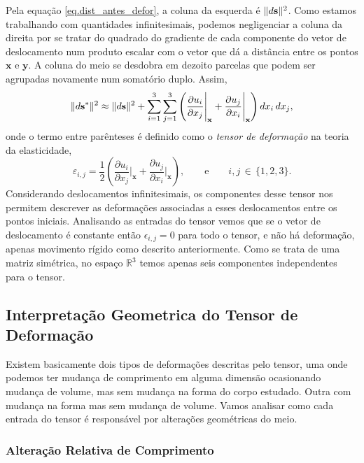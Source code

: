Pela equa\c{c}\~ao \ref{eq.dist_antes_defor}, a coluna  da esquerda \'e $\lVert d\mathbf{s}\rVert^2$. Como estamos trabalhando com quantidades infinitesimais, podemos negligenciar a coluna da direita por se tratar do quadrado do gradiente de cada componente do vetor de deslocamento num produto escalar com o vetor que d\'a a dist\^ancia entre os pontos $\mathbf{x}$  e $\mathbf{y}$. A coluna do meio se desdobra em dezoito parcelas que podem ser agrupadas novamente num somat\'orio duplo. Assim,
\begin{equation*}
\lVert d\mathbf{s}^*\rVert^2\approx\lVert d\mathbf{s}\rVert^2+\sum_{i=1}^3\sum_{j=1}^3\left(\frac{\partial u_i}{\partial x_j}\Bigg\vert_{\mathbf{x}}+\frac{\partial u_j}{\partial x_i}\Bigg\vert_{\mathbf{x}}\right)dx_i\,dx_j,
\end{equation*}
onde o termo entre par\^enteses \'e definido como o \textit{tensor de deforma\c{c}\~ao} na teoria da elasticidade,
\begin{equation*}
\varepsilon_{i,j}=\frac{1}{2}\left(\frac{\partial u_i}{\partial x_j}\Bigg\vert_{\mathbf{x}}+\frac{\partial u_j}{\partial x_i}\Bigg\vert_{\mathbf{x}}\right),\qquad\text{e}\qquad i,j\,\in\,\{1,2,3\}.
\end{equation*}
Considerando deslocamentos infinitesimais, os componentes desse tensor nos permitem descrever as deforma\c{c}\~oes associadas a esses deslocamentos entre os pontos iniciais. Analisando as entradas do tensor vemos que se o vetor de deslocamento \'e constante ent\~ao $\epsilon_{i,j}=0$ para todo o tensor, e n\~ao h\'a deforma\c{c}\~ao, apenas movimento r\'igido como descrito anteriormente. Como se trata de uma matriz sim\'etrica, no espa\c{c}o $\mathbb{R}^3$ temos apenas seis componentes independentes para o tensor.

\subsection{Interpreta\c{c}\~ao Geometrica do Tensor de Deforma\c{c}\~ao}

Existem basicamente dois tipos de deforma\c{c}\~oes descritas pelo tensor, uma onde podemos ter mudan\c{c}a de comprimento em alguma dimens\~ao ocasionando mudan\c{c}a de volume, mas sem mudan\c{c}a na forma do corpo estudado. Outra com mudan\c{c}a na forma mas sem mudan\c{c}a de volume. Vamos analisar como cada entrada do tensor \'e respons\'avel por altera\c{c}\~oes geom\'etricas do meio.

\subsubsection{Altera\c{c}\~ao Relativa de Comprimento}\label{sec.alte_compri}

